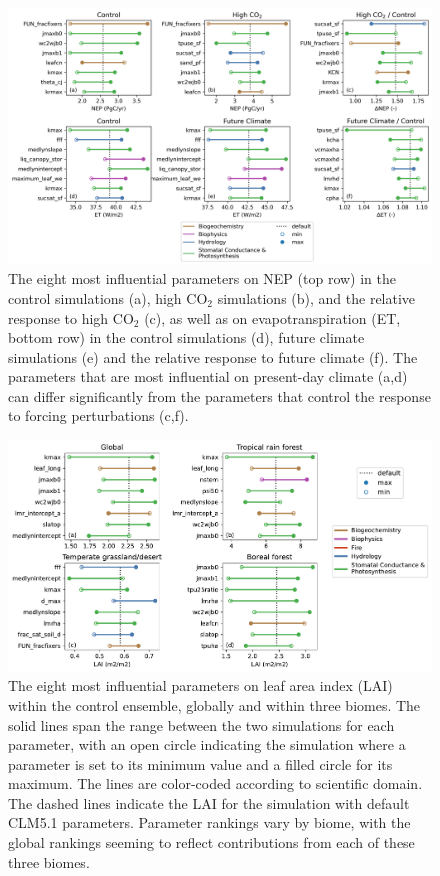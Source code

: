 \documentclass[draft]{agujournal2019}
\begin{document}
\begin{figure}[h]
\centering
\includegraphics[width=\textwidth]{../figs/main/deltas.png}
\caption{The eight most influential parameters  on NEP (top row) in the control simulations (a), high CO$_2$ simulations (b), and the relative response to high CO$_2$ (c), as well as on evapotranspiration (ET, bottom row) in the control simulations (d), future climate simulations (e) and the relative response to future climate (f). The parameters that are most influential on present-day climate (a,d) can differ significantly from the parameters that control the response to forcing perturbations (c,f).}
\label{fig:nep}
\end{figure}


\begin{figure}[h]
\centering
\includegraphics[width=\textwidth]{../figs/main/lai_biome.pdf}
\caption{The eight most influential parameters  on leaf area index (LAI) within the control ensemble, globally and within three biomes. The solid lines span the range between the two simulations for each parameter, with an open circle indicating the simulation where a parameter is set to its minimum value and a filled circle for its maximum. The lines are color-coded according to scientific domain. The dashed lines indicate the LAI for the simulation with default CLM5.1 parameters. Parameter rankings vary by biome, with the global rankings seeming to reflect contributions from each of these three biomes.}
\label{fig:lai}
\end{figure}
\end{document}
